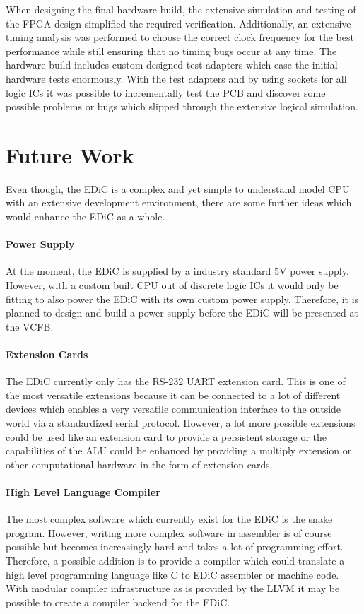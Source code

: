 When designing the final hardware build, the extensive simulation and testing of the \gls{FPGA} design simplified the required verification.
Additionally, an extensive timing analysis was performed to choose the correct clock frequency for the best performance while still ensuring that no timing bugs occur at any time.
The hardware build includes custom designed test adapters which ease the initial hardware tests enormously.
With the test adapters and by using sockets for all logic \glspl{IC} it was possible to incrementally test the \gls{PCB} and discover some possible problems or bugs which slipped through the extensive logical simulation.

\section{Future Work}
Even though, the \gls{EDiC} is a complex and yet simple to understand model \gls{CPU} with an extensive development environment, there are some further ideas which would enhance the \gls{EDiC} as a whole.

\paragraph{Power Supply} At the moment, the \gls{EDiC} is supplied by a industry standard 5V power supply.
However, with a custom built \gls{CPU} out of discrete logic \glspl{IC} it would only be fitting to also power the \gls{EDiC} with its own custom power supply.
Therefore, it is planned to design and build a power supply before the \gls{EDiC} will be presented at the \gls{VCFB}. \cite{vcfb}

\paragraph{Extension Cards} The \gls{EDiC} currently only has the RS-232 \gls{UART} extension card.
This is one of the most versatile extensions because it can be connected to a lot of different devices which enables a very versatile communication interface to the outside world via a standardized serial protocol.
However, a lot more possible extensions could be used like an extension card to provide a persistent storage or the capabilities of the \gls{ALU} could be enhanced by providing a multiply extension or other computational hardware in the form of extension cards.

\paragraph{High Level Language Compiler} The most complex software which currently exist for the \gls{EDiC} is the snake program.
However, writing more complex software in assembler is of course possible but becomes increasingly hard and takes a lot of programming effort.
Therefore, a possible addition is to provide a compiler which could translate a high level programming language like C to \gls{EDiC} assembler or machine code.
With modular compiler infrastructure as is provided by the LLVM it may be possible to create a compiler backend for the \gls{EDiC}.
